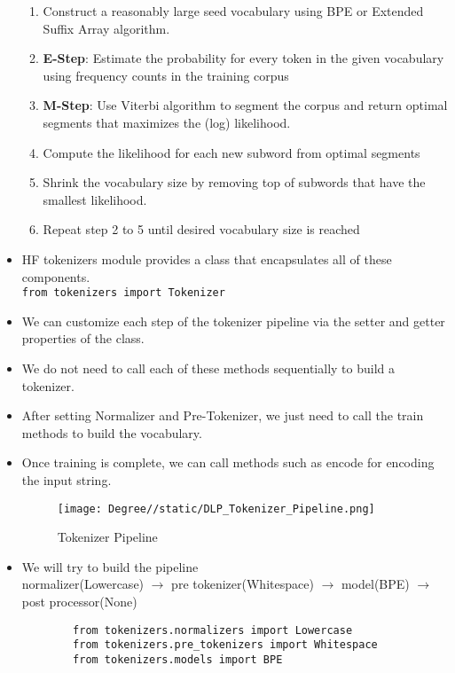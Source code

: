 \documentclass[a4paper]{article}
\begin{document}
\begin{itemize}
\begin{enumerate}
        \item Construct a reasonably large seed vocabulary using BPE or Extended Suffix Array algorithm.
        \item \textbf{E-Step}: Estimate the probability for every token in the given vocabulary using frequency counts in the training corpus
        \item \textbf{M-Step}: Use Viterbi algorithm to segment the corpus and return optimal segments that maximizes the (log) likelihood.
        \item Compute the likelihood for each new subword from optimal segments
        \item Shrink the vocabulary size by removing top of subwords that have the smallest likelihood.
        \item Repeat step 2 to 5 until desired vocabulary size is reached
    \end{enumerate}
    \item HF tokenizers module provides a class that encapsulates all of these components.\\
    \verb|from tokenizers import Tokenizer|
    \item We can customize each step of the tokenizer pipeline via the setter and getter properties of the class.
    \item We do not need to call each of these methods sequentially to build a tokenizer.
    \item After setting Normalizer and Pre-Tokenizer, we just need to call the train methods to build the vocabulary.
    \item Once training is complete, we can call methods such as encode for encoding the input string.
    \begin{figure}[H]
        \centering
        \texttt{[image: Degree//static/DLP\_Tokenizer\_Pipeline.png]}
        \caption{Tokenizer Pipeline}
    \end{figure}
    \item We will try to build the pipeline\\
    normalizer(Lowercase) $\to$ pre tokenizer(Whitespace) $\to$ model(BPE) $\to$ post processor(None)
    \vspace{-1mm}
    \begin{verbatim}
        from tokenizers.normalizers import Lowercase
        from tokenizers.pre_tokenizers import Whitespace
        from tokenizers.models import BPE
    \end{verbatim}
    \vspace{-7mm}

\end{itemize}
\end{document}
